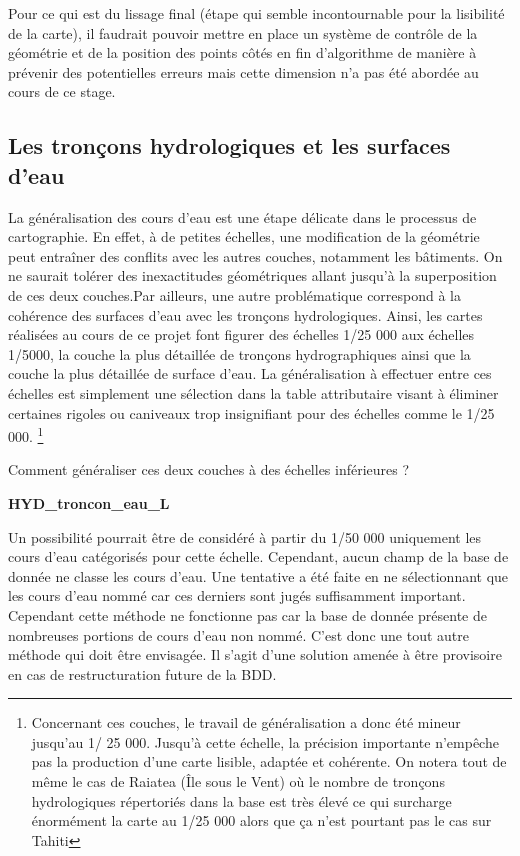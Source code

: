 Pour ce qui est du lissage final (étape qui semble incontournable pour la lisibilité de la carte), il faudrait pouvoir mettre en place un système de contrôle de la géométrie et de la position des points côtés en fin d'algorithme de manière à prévenir des potentielles erreurs mais cette dimension n'a pas été abordée au cours de ce stage.



\subsection{Les tronçons hydrologiques et les surfaces d'eau}

La généralisation des cours d'eau est une étape délicate dans le processus de cartographie. En effet, à de petites échelles, une modification de la géométrie peut entraîner des conflits avec les autres couches, notamment les bâtiments. On ne saurait tolérer des inexactitudes géométriques allant jusqu'à la superposition de ces deux couches.Par ailleurs, une autre problématique correspond à la cohérence des surfaces d'eau avec les tronçons hydrologiques. Ainsi, les cartes réalisées au cours de ce projet font figurer des échelles 1/25 000 aux échelles 1/5000, la couche la plus détaillée de tronçons hydrographiques ainsi que la couche la plus détaillée de surface d'eau. La généralisation à effectuer entre ces échelles est simplement une sélection dans la table attributaire visant à éliminer certaines rigoles ou caniveaux trop insignifiant pour des échelles comme le 1/25 000. \footnote{Concernant ces couches, le travail de généralisation a donc été mineur jusqu'au 1/ 25 000. Jusqu'à cette échelle, la précision importante n'empêche pas la production d'une carte lisible, adaptée et cohérente. On notera  tout de même le cas de Raiatea (Île sous le Vent) où le nombre de tronçons hydrologiques répertoriés dans la base est très élevé ce qui surcharge énormément la carte au 1/25 000 alors que ça n'est pourtant pas le cas sur Tahiti}


\begin{center}
Comment généraliser ces deux couches à des échelles inférieures ?
\end{center}

\begin{center}
    \footnotesize
    \textbf{HYD\_troncon\_eau\_L}
\end{center}
Un possibilité pourrait être de considéré à partir du 1/50 000 uniquement les cours d'eau catégorisés pour cette échelle. Cependant, aucun champ de la base de donnée ne classe les cours d'eau. Une tentative a été faite en ne sélectionnant que les cours d'eau nommé car ces derniers sont jugés suffisamment important. Cependant cette méthode ne fonctionne pas car la base de donnée présente de nombreuses portions de cours d'eau non nommé. C'est donc une tout autre méthode qui doit être envisagée. Il s'agit d'une solution amenée à être provisoire en cas de restructuration future de la BDD.

